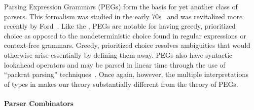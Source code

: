 Parsing Expression Grammars (PEGs) form the basis for yet another
class of parsers. This formalism was studied in the early
70s~\cite{birman+:parsing} and was revitalized more recently by
Ford~\cite{ford:pegs}.  Like the \ddc{}, PEGs are notable for
having greedy, prioritized 
choice as opposed to the nondeterministic choice found in regular
expressions or context-free grammars.  Greedy, prioritized choice
resolves ambiguities that would otherwise arise essentially
by defining them away.  PEGs also have syntactic lookahead
operators and may be parsed in linear time through the use of
``packrat parsing'' techniques~\cite{ford:packrat,grimm:packrat}.
Once again, however, the multiple interpretations of types in \ddc{} makes our
theory substantially different from the theory of PEGs.


\paragraph*{Parser Combinators}


